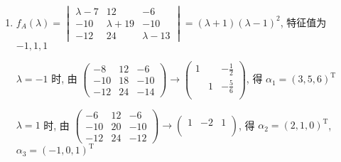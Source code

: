      \paragraph{} %
         \begin{enumerate}
             \item %
                   \( f_{A}(\lambda) = \begin{vmatrix}
                       \lambda - 7 & 12           & -6           \\
                       -10         & \lambda + 19 & -10          \\
                       -12         & 24           & \lambda - 13
                   \end{vmatrix} = (\lambda + 1)(\lambda - 1)^{2} \), 特征值为 \( -1, 1, 1 \)

                   \( \lambda = -1 \) 时, 由 \( \begin{pmatrix}
                       -8  & 12 & -6  \\
                       -10 & 18 & -10 \\
                       -12 & 24 & -14
                   \end{pmatrix} \rightarrow \begin{pmatrix}
                       1 &   & -\frac{1}{2} \\
                         & 1 & -\frac{5}{6} \\
                         &   &
                   \end{pmatrix} \), 得 \( \alpha_{1} = (3, 5, 6)^{\mathrm{T}} \)

                   \( \lambda = 1 \) 时, 由 \( \begin{pmatrix}
                       -6  & 12 & -6  \\
                       -10 & 20 & -10 \\
                       -12 & 24 & -12
                   \end{pmatrix} \rightarrow \begin{pmatrix}
                       1 & -2 & 1 \\
                         &    &   \\
                         &    &
                   \end{pmatrix} \), 得 \( \alpha_{2} = (2, 1, 0)^{\mathrm{T}} \), \( \alpha_{3} = (-1, 0, 1)^{\mathrm{T}} \)


\end{enumerate}
